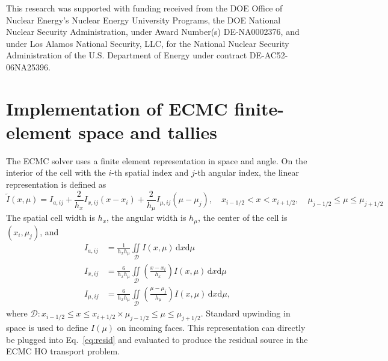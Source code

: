 \documentclass[12pt]{article}
\newcommand{\ess}{\doublespacing}
\renewcommand{\d}{\mathrm{d}}
\newcommand{\il}{{i-1/2}}
\newcommand{\ir}{{i+1/2}}
\newcommand{\jl}{{j-1/2}}
\newcommand{\jr}{{j+1/2}}
\begin{document}
\begin{center}
This research was supported with funding received from the DOE Office of Nuclear
Energy's Nuclear Energy University Programs, the DOE National
Nuclear Security Administration, under Award Number(s) DE-NA0002376, and under Los Alamos National Security,
LLC, for the National Nuclear Security Administration of the U.S. Department of
Energy under contract DE-AC52-06NA25396. 

\setlength{\baselineskip}{12pt}
\clearpage
\ess


\clearpage
\appendix

\ess

\section{Implementation of ECMC finite-element space and tallies}

\label{app:tallies}

The ECMC solver uses a finite element representation in space and angle. On the
interior of the cell with the $i$-th spatial index and $j$-th angular index, the linear representation is defined as
\begin{equation*}
    \tilde I(x,\mu) = I_{a,ij} + \frac{2}{h_x}I_{x,ij}\left(x-x_i\right) +
    \frac{2}{h_\mu}I_{\mu,ij}\left(\mu-\mu_j\right), \quad x_\il <  x < x_\ir,\quad
     \mu_\jl \leq \mu \leq \mu_\jr
\end{equation*}
The spatial cell width is $h_x$, the angular width is
$h_\mu$, the center of the cell is $(x_i,\mu_j)$, and
\begin{align}\label{app1}
    I_{a,ij} &= \frac{1}{h_x h_\mu} \iint\limits_{\mathcal{D}} I(x,\mu)\, \d x \d \mu \\
    I_{x,ij} &= \frac{6}{h_xh_\mu}\iint\limits_{\mathcal{D}} \left(\frac{x - x_i}{h_{x}}\right)
    I(x,\mu)\, \d x \d \mu \\ \label{app2}
    I_{\mu,ij} &= \frac{6}{h_xh_\mu}\iint\limits_{\mathcal{D}}
     \left(\frac{\mu - \mu_j}{h_{\mu}}\right)
    I(x,\mu)\, \d x \d \mu,
\end{align}
where $\mathcal{D}: x_\il \leq  x \leq  x_\ir \times \mu_\jl \leq \mu \leq \mu_\jr$.
Standard upwinding in space is used to
define $I(\mu)$ on incoming faces. This representation can directly be plugged into
Eq.~\eqref{eq:resid} and evaluated to produce the residual source in the ECMC HO transport
problem. 


\end{center}
\end{document}
